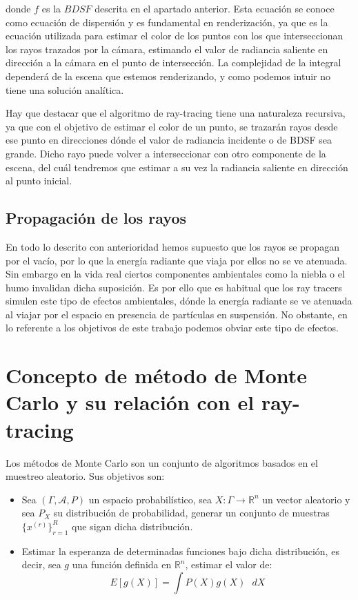 donde $f$ es la $BDSF$ descrita en el apartado anterior. Esta ecuación se conoce como ecuación de dispersión y es fundamental en renderización, ya que es la ecuación utilizada para estimar el color de los puntos con los que interseccionan los rayos trazados por la cámara, estimando el valor de radiancia saliente en dirección a la cámara en el punto de intersección. La complejidad de la integral dependerá de la escena que estemos renderizando, y como podemos intuir no tiene una solución analítica.

Hay que destacar que el algoritmo de ray-tracing tiene una naturaleza recursiva, ya que con el objetivo de estimar el color de un punto, se trazarán rayos desde ese punto en direcciones dónde el valor de radiancia incidente o de BDSF sea grande. Dicho rayo puede volver a interseccionar con otro componente de la escena, del cuál tendremos que estimar a su vez la radiancia saliente en dirección al punto inicial.

\subsection{Propagación de los rayos}

En todo lo descrito con anterioridad hemos supuesto que los rayos se propagan por el vacío, por lo que la energía radiante que viaja por ellos no se ve atenuada. Sin embargo en la vida real ciertos componentes ambientales como la niebla o el humo invalidan dicha suposición. Es por ello que es habitual que los ray tracers simulen este tipo de efectos ambientales, dónde la energía radiante se ve atenuada al viajar por el espacio en presencia de partículas en suspensión. No obstante, en lo referente a los objetivos de este trabajo podemos obviar este tipo de efectos.

\section{Concepto de método de Monte Carlo y su relación con el ray-tracing}

Los métodos de Monte Carlo son un conjunto de algoritmos basados en el muestreo aleatorio. Sus objetivos son:

\begin{itemize}
\item Sea $(\Gamma, \mathcal{A}, P)$ un espacio probabilístico, sea $X:\Gamma \rightarrow \mathds{R}^n$ un vector aleatorio y sea $P_X$ su distribución de probabilidad, generar un conjunto de muestras $\{x^{(r)}\}_{r=1}^R$ que sigan dicha distribución. 
\item Estimar la esperanza de determinadas funciones bajo dicha distribución, es decir, sea $g$ una función definida en $\mathds{R}^n$, estimar el valor de:
$$ E[g(X)] = \int P(X)g(X)\text{ }dX$$
\end{itemize}

